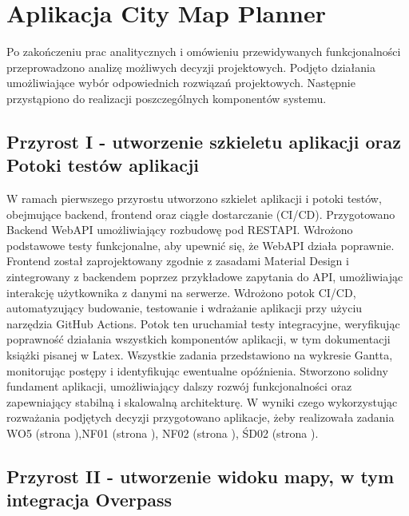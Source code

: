 \section{Aplikacja City Map Planner}
\label{sec:aplikacja}

Po zakończeniu prac analitycznych i omówieniu przewidywanych funkcjonalności przeprowadzono analizę możliwych decyzji projektowych. 
Podjęto działania umożliwiające wybór odpowiednich rozwiązań projektowych. 
Następnie przystąpiono do realizacji poszczególnych komponentów systemu.

\subsection{Przyrost I - utworzenie szkieletu aplikacji oraz Potoki testów aplikacji}
\label{sec:przyrost1}

W ramach pierwszego przyrostu utworzono szkielet aplikacji i potoki testów, obejmujące backend, frontend oraz ciągłe dostarczanie (CI/CD). \newline
\indent Przygotowano Backend WebAPI umożliwiający rozbudowę pod RESTAPI. Wdrożono podstawowe testy funkcjonalne, aby upewnić się, że WebAPI działa poprawnie.\newline
\indent Frontend został zaprojektowany zgodnie z zasadami Material Design i zintegrowany z backendem poprzez przykładowe zapytania do API, umożliwiając interakcję użytkownika z danymi na serwerze. \newline
\indent Wdrożono potok CI/CD, automatyzujący budowanie, testowanie i wdrażanie aplikacji przy użyciu narzędzia GitHub Actions. Potok ten uruchamiał testy integracyjne, weryfikując poprawność działania wszystkich komponentów aplikacji, w tym dokumentacji książki pisanej w Latex. \newline
\indent Wszystkie zadania przedstawiono na wykresie Gantta, monitorując postępy i identyfikując ewentualne opóźnienia. Stworzono solidny fundament aplikacji, umożliwiający dalszy rozwój funkcjonalności oraz zapewniający stabilną i skalowalną architekturę. \newline
W wyniki czego wykorzystując rozważania podjętych decyzji przygotowano aplikacje, żeby realizowała zadania WO5 (strona \pageref{tab:requirements:general5}),NF01 (strona \pageref{tab:requirements:nonfunc1}), NF02 (strona \pageref{tab:requirements:nonfunc2}), ŚD02 (strona \pageref{tab:requirements:envfunc2}).

\subsection{Przyrost II - utworzenie widoku mapy, w tym integracja  Overpass}
    \label{sec:przyrost2}

